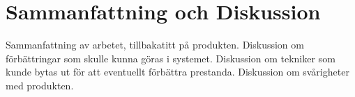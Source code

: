 \section{Sammanfattning och Diskussion}

Sammanfattning av arbetet, tillbakatitt på produkten. Diskussion om förbättringar som skulle kunna göras i systemet. Diskussion om tekniker som kunde bytas ut för att eventuellt förbättra prestanda. Diskussion om svårigheter med produkten.


